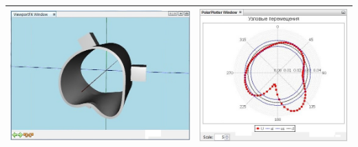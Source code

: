 \documentclass[14pt,oneside,final]{extreport}
\begin{document}
\begin{table}[]
{{\begin{tabu}[]{|c|c|}
					\includegraphics[scale=0.55]{img/simulation-force-test-model3} & \includegraphics[scale=0.55]{img/simulation-force-test-graph3}  \\ 
					\hline
				\end{tabu}
			}
	}\end{table}
\end{document}
